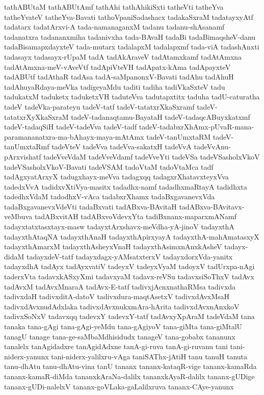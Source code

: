 {tathABUtaM
tathABUtAmf
tathAhi
tathAhikiSxti
tatheVti
tatheYva
tatheYvateV
tatheYva-Bavati
tathoVpaniSadashacx
tadakaSxraM
tadatayxyAtf
tadatarx
tadatArxvi-A
tada-namanaganxM
tadanu
tadanu-shAsanamf
tadanatxra
tadananxmiha
tadanivxha
tada-BAvaH
tadaBi
tadaBimaqsheV-danu
tadaBisamapxdayxteV
tada-mutarx
tadalapxM
tadalapxmf
tada-viA
tadashAnxti
tadasayx
tadasayx-rUpaM
tadA
tadAkAraveV
tadAtamxkamf
tadAtAmxna
tadAtAmxna-meV-vAveVtf
tadApiVteVH
tadApatx-kAma
tadApayxteV
tadABUtf
tadAthaR
tadAsa
tadA-saMpanonxV-Bavati
tadAhu
tadAhuH
tadAhuyaRdaya-meVka
tadigeyaMdu
taditi
tadiha
tadiVkaSxteV
tadu
tadukatxM
taduketx
taduketxVH
taduteVva
tadutapxtitx
taduha
tadU-caturatha
tadeV
tadeVka-parateyu
tadeV-tatf
tadeV-tatatxrXkaSxramf
tadeV-tatatxrXyXkaSxraM
tadeV-tadanaqtamu-BayataH
tadeV-tadaqcABuyxkatxmf
tadeV-tadaqSiH
tadeV-tadeVva
tadeV-tadf
tadeV-tadabxrXhAmx-pUvaR-mana-paramananatxra-ma-bAhayx-maya-mAtAmx
tadeV-tanUmxtaRM
tadeV-tanUmxtaRmf
tadeVteV
tadeVva
tadeVva-sakatxH
tadeVvA
tadeVvAnu-pArxvishatf
tadeVveVdaM
tadeVveVdamf
tadeVveYti
tadeVSa
tadeVSasholxVkoV
tadeVSasholxVkoV-Bavati
tadeVSAM
tadoVtaM
tadoVtaMca
tadf
tadAgxyatArxyX
tadugxhayx-meVva
tadagxqq
tadagxrXhatavxteyxVva
tadedxVvA
tadidxvXtiVya-masitx
tadadhx-namf
tadadhxmaRtayA
tadidhxta
tadedhxVdaM
tadodhxV-vAca
tadabxrXhamx
tadaBxgavanevxVda
tadaBxgavanevxVdeVti
tadaBxvati
tadABxva-BAvitaH
tadABxva-BAvitavx-veMbuva
tadABxvitAH
tadABxvoVdevxYta
tadiBxnanx-maparxmANamf
tadayxtatxtasxtayx-masw
tadayxtArxshavx-meVdha-yA-jinoV
tadayxthA
tadayxthAtaqNA
tadayxthAnaH
tadayxthApirxyayA
tadayxthA-mahAmatasxyX
tadayxthAmarxM
tadayxthAsheyxVnaH
tadayxthAsimxnAnxkAsheV
tadayx-didaM
tadayxdeV-tatf
tadayxdagx-yAMsatxterxV
tadayxdorxVda-yanitx
tadayxdhA
tadAyx
tadAyxvatiV
tadeyxV
tadeyxVyaM
tadoyxV
tadUrxpa-nAgi
taderxVta
tadavxkASxyXmi
tadavxyaM
tadavx-reVSu
tadavxsiSoThxV
tadAvx
tadAvxM
tadAvxMnaraA
tadAvx-E-tatf
tadivxjAcnxnathaRMsa
tadivxda
tadivxdaH
tadivxditA-datoV
tadivxdura-maqtAsetxV
tadivxdAvxMsaH
tadivxdAvxnudAdxlaka
tadivxdAvxnukxmAra-hArita
tadivxdAvxnAnxkoV
tadivxSoNxV
tadavxqq
tadevxY
tadevxY-tatf
tadAvxyXpAraM
tadeVdaM
tana
tanaka
tana-gAgi
tana-gAgi-yeMdu
tana-gAgiyoV
tana-giMta
tana-giMtalU
tanagU
tanage
tana-ge-saMbaMdhisidudx
tanageV
tana-gobabx
tananunx
tanalelx
tanAgidadxre
tanAgidAdxne
tanA-gi-ruva
tanA-gi-ruvanu
tani
tani-niderx-yanunx
tani-niderx-yalilxru-vAga
taniSAThx-jAtiH
tanu
tanuH
tanuta
tanu-dhAtu
tanu-dhAtu-vina
tanU
tananx
tananx-kataqR-vige
tananx-kamaRda
tananx-kamaR-diMda
tananxkAraNa-dalilx
tananxkAyaR-dalilx
tananx-gUDige
tananx-gUDi-nalelxV
tananx-goVLaka-gaLalilxruva
tananx-CAye-yanunx
}

